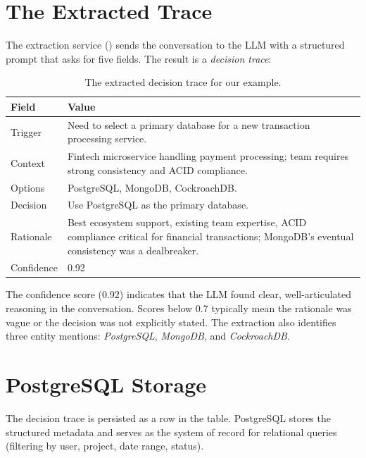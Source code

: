 \section{The Extracted Trace}
\label{sec:extracted-trace}

The extraction service () sends the
conversation to the LLM with a structured prompt that asks for five fields.
The result is a \emph{decision trace}:

\begin{table}[ht]
\centering
\caption{The extracted decision trace for our example.}
\label{tab:extracted-trace}
\begin{tabularx}{\textwidth}{l X}
\toprule
\textbf{Field} & \textbf{Value} \\
\midrule
Trigger    & Need to select a primary database for a new transaction processing service. \\
Context    & Fintech microservice handling payment processing; team requires strong
             consistency and ACID compliance. \\
Options    & PostgreSQL, MongoDB, CockroachDB. \\
Decision   & Use PostgreSQL as the primary database. \\
Rationale  & Best ecosystem support, existing team expertise, ACID compliance critical
             for financial transactions; MongoDB's eventual consistency was a
             dealbreaker. \\
Confidence & 0.92 \\
\bottomrule
\end{tabularx}
\end{table}

The confidence score (0.92) indicates that the LLM found clear, well-articulated
reasoning in the conversation.  Scores below 0.7 typically mean the rationale
was vague or the decision was not explicitly stated.  The extraction also
identifies three entity mentions: \emph{PostgreSQL}, \emph{MongoDB}, and
\emph{CockroachDB}.


\section{PostgreSQL Storage}
\label{sec:postgres-storage}

The decision trace is persisted as a row in the  table.
PostgreSQL stores the structured metadata and serves as the system of record for
relational queries (filtering by user, project, date range, status).

